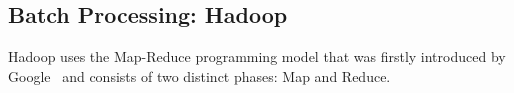 
\subsection{Batch Processing: Hadoop}\label{sec:map_reduce_hadoop}
Hadoop uses the Map-Reduce programming model that was firstly introduced by Google~\cite{misc:GoogleMapReduce} and consists of two distinct phases: Map and Reduce.

